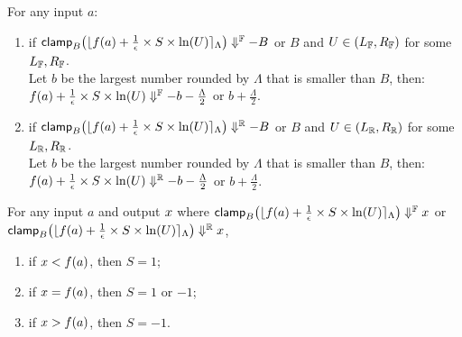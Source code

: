 \documentclass[a4paper,11pt]{article}
\begin{document}
\begin{lem}
[ZeroBoundR]
\label{lem:zeroboundr}
For any input $a$:
\begin{enumerate}
\item 
if 
$\mathsf{clamp}_B \big(
	\lfloor f(a) + \frac{1}{\epsilon} \times S \times \ln (U) \rceil_{\Lambda}
	\big)
	\Downarrow^{\mathbb{F}} -B$ or $B$ and $U \in (L_{\mathbb{F}}, R_{\mathbb{F}})$ for some $L_{\mathbb{F}}, R_{\mathbb{F}}$.
	\\
	 Let $b$ be the largest number rounded by $\Lambda$ that is smaller than $B$, 
	 then:
	 \\
	$f(a) + \frac{1}{\epsilon} \times S \times \ln (U) \Downarrow^{\mathbb{F}} -b - \frac{\Lambda}{2}$ or $b + \frac{\Lambda}{2}$.
%
\item
if
$\mathsf{clamp}_B \big(
	\lfloor f(a) + \frac{1}{\epsilon} \times S \times \ln (U) \rceil_{\Lambda}
	\big)
	\Downarrow^{\mathbb{R}} -B$ or $B$ and $U \in (L_{\mathbb{R}}, R_{\mathbb{R}})$ for some $L_{\mathbb{R}}, R_{\mathbb{R}}$.
	\\
	 Let $b$ be the largest number rounded by $\Lambda$ that is smaller than $B$, 
	 then:
	 \\
	$f(a) + \frac{1}{\epsilon} \times S \times \ln (U) \Downarrow^{\mathbb{R}} -b - \frac{\Lambda}{2}$ or $b + \frac{\Lambda}{2}$.
\end{enumerate}
\end{lem}

\begin{lem}[sign]
\label{lem:sign}
For any input $a$ and output $x$ where
$\mathsf{clamp}_B \big(
	\lfloor f(a) + \frac{1}{\epsilon} \times S \times \ln (U) \rceil_{\Lambda}
	\big)
	\Downarrow^{\mathbb{F}} x$ 
or $\mathsf{clamp}_B \big(
	\lfloor f(a) + \frac{1}{\epsilon} \times S \times \ln (U) \rceil_{\Lambda}
	\big)
	\Downarrow^{\mathbb{R}} x$,
%
\begin{enumerate}
	\item if $x < f(a)$, then $S = 1$;
	\item if $x = f(a)$, then $S = 1$ or $ -1$;
	\item if $x > f(a)$, then $S = -1$.
\end{enumerate}
\end{lem}
\end{document}
